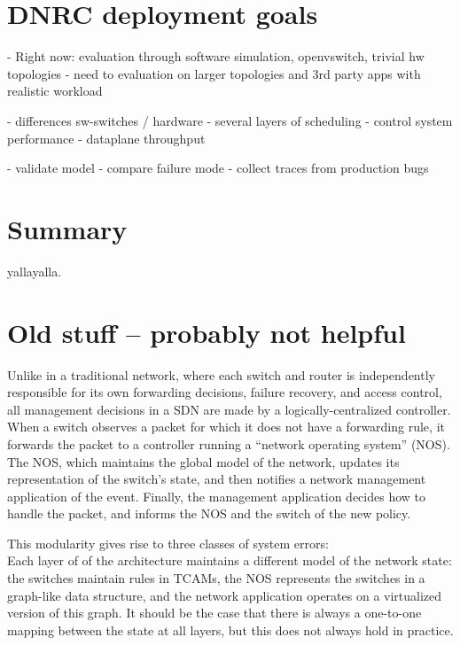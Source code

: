\documentclass{sig-alternate-10pt}
\begin{document}
\section{DNRC deployment goals}

- Right now: evaluation through software simulation, openvswitch,
trivial hw topologies
- need to evaluation on larger topologies and 3rd party apps with realistic
workload

- differences sw-switches / hardware
   - several layers of scheduling
   - control system performance
   - dataplane throughput

- validate model
  - compare failure mode
  - collect traces from production bugs

\section{Summary}

yallayalla.

\section{Old stuff -- probably not helpful}

Unlike in a traditional network, where each switch and router is independently responsible for
its own forwarding decisions, failure recovery, and access control, all management
decisions in a SDN are made by a logically-centralized controller. When a
switch observes a packet for which it does not have a forwarding rule,
it forwards the packet to a controller running a ``network operating system''
(NOS). The NOS, which maintains the global model of the network, updates its representation
of the switch's state, and then notifies a network management application of the event.
Finally, the management application decides how to handle the packet, and informs the NOS
and the switch of the new policy.

This modularity gives rise to three classes of system errors: \\
Each layer of of the architecture maintains a different model of the network state: the
switches maintain rules in TCAMs, the NOS represents the switches
in a graph-like data structure, and the network application operates on 
a virtualized version of this graph. It should be
the case that there is always a one-to-one mapping between the state at all
layers, but this does not always hold in practice.
\end{document}
